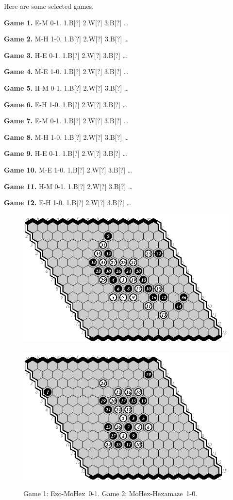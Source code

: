 \documentclass{icga}
\def\Eo{\mbox{\sc Ezo}}
\def\Hz{\mbox{\sc Hexamaze}}
\def\Mx{\mbox{\sc MoHex}}
\begin{document}
Here are some selected games.


{\bf Game 1.}
{\sc E-M 0-1.}
1.B[?] 2.W[?] 3.B[?] \ldots ~ ~ 

{\bf Game 2.}
{\sc M-H 1-0.}
1.B[?] 2.W[?] 3.B[?] \ldots ~ ~ 

{\bf Game 3.}
{\sc H-E 0-1.}
1.B[?] 2.W[?] 3.B[?] \ldots ~ ~ 

{\bf Game 4.}
{\sc M-E 1-0.}
1.B[?] 2.W[?] 3.B[?] \ldots ~ ~ 

{\bf Game 5.}
{\sc H-M 0-1.}
1.B[?] 2.W[?] 3.B[?] \ldots ~ ~ 

{\bf Game 6.}
{\sc E-H 1-0.}
1.B[?] 2.W[?] 3.B[?] \ldots ~ ~ 

{\bf Game 7.}
{\sc E-M 0-1.}
1.B[?] 2.W[?] 3.B[?] \ldots ~ ~ 

{\bf Game 8.}
{\sc M-H 1-0.}
1.B[?] 2.W[?] 3.B[?] \ldots ~ ~ 

{\bf Game 9.}
{\sc H-E 0-1.}
1.B[?] 2.W[?] 3.B[?] \ldots ~ ~ 

{\bf Game 10.}
{\sc M-E 1-0.}
1.B[?] 2.W[?] 3.B[?] \ldots ~ ~ 

{\bf Game 11.}
{\sc H-M 0-1.}
1.B[?] 2.W[?] 3.B[?] \ldots ~ ~ 

{\bf Game 12.}
{\sc E-H 1-0.}
1.B[?] 2.W[?] 3.B[?] \ldots ~ ~ 

\begin{figure}[hbp]
\includegraphics[scale=1.2]{games/pix/13-01-em-0-1.eps}\hspace*{-1cm}\
\includegraphics[scale=1.2]{games/pix/13-02-mh-1-0.eps}
\caption{Game 1: \Eo-\Mx\ 0-1. Game 2: \Mx-\Hz\ 1-0.}
\end{figure}
\end{document}
